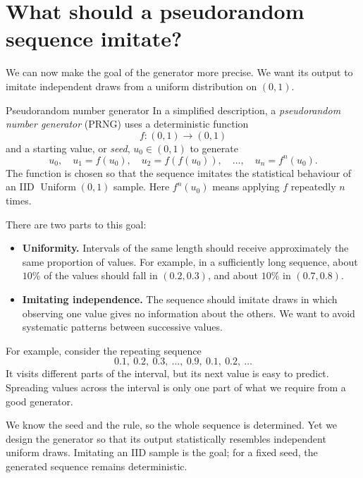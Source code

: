 \documentclass[a4paper,12pt,oneside]{report}
\begin{document}
\section{What should a pseudorandom sequence imitate?}
\label{sec:prng-uniform}
We can now make the goal of the generator more precise. We want
its output to imitate independent draws from a uniform distribution
on $(0,1)$.

\begin{frameddefn}{Pseudorandom number generator}
\label{def:prng}
In a simplified description, a \emph{pseudorandom number generator}
(PRNG) uses a deterministic function
\[
  f:(0,1)\longrightarrow(0,1)
\]
and a starting value, or \emph{seed}, $u_0\in(0,1)$ to generate
\[
  u_0,\quad u_1=f(u_0),\quad u_2=f(f(u_0)),\quad
  \ldots,\quad u_n=f^n(u_0).
\]
The function is chosen so that the sequence imitates the statistical
behaviour of an IID $\operatorname{Uniform}(0,1)$ sample.
Here $f^n(u_0)$ means applying $f$ repeatedly $n$ times.
\end{frameddefn}

There are two parts to this goal:
\begin{itemize}
  \item \textbf{Uniformity.} Intervals of the same length should
    receive approximately the same proportion of values. For example,
    in a sufficiently long sequence, about $10\%$ of the values
    should fall in $(0.2,0.3)$, and about $10\%$ in $(0.7,0.8)$.
  \item \textbf{Imitating independence.} The sequence should imitate
    draws in which observing one value gives no information about
    the others. We want to avoid systematic patterns between
    successive values.
\end{itemize}

For example, consider the repeating sequence
\[
  0.1,\ 0.2,\ 0.3,\ \ldots,\ 0.9,\ 0.1,\ 0.2,\ \ldots
\]
It visits different parts of the interval, but its next value is
easy to predict. Spreading values across the interval is only one
part of what we require from a good generator.

\begin{notebox}
We know the seed and the rule, so the whole sequence is determined.
Yet we design the generator so that its output statistically
resembles independent uniform draws. Imitating an IID sample is
the goal; for a fixed seed, the generated sequence remains
deterministic.
\end{notebox}
\end{document}
